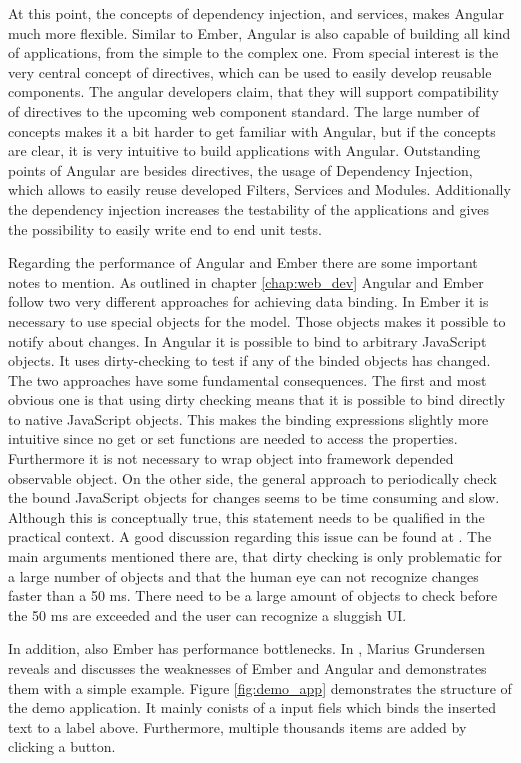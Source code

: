 At this point, the concepts of dependency injection, and services, makes Angular much more flexible.
Similar to Ember, Angular is also capable of building all kind of applications, from the simple to the complex one.
From special interest is the very central concept of directives, which can be used to easily develop reusable components. The angular developers claim, that they will support compatibility of directives to the upcoming web component standard.
The large number of concepts makes it a bit harder to get familiar with Angular, but if the concepts are clear, it is very intuitive to build applications with Angular.
Outstanding points of Angular are besides directives, the usage of Dependency Injection, which allows to easily reuse developed Filters, Services and Modules. Additionally the dependency injection increases the testability of the applications and gives the possibility to easily write end to end unit tests. 

Regarding the performance of Angular and Ember there are some important notes to mention. As outlined in chapter \ref{chap:web_dev} Angular and Ember follow two very different approaches for achieving data binding. In Ember it is necessary to use special objects for the model. Those objects makes it possible to notify about changes. In Angular it is possible to bind to arbitrary JavaScript objects. It uses dirty-checking to test if any of the binded objects has changed.
The two approaches have some fundamental consequences.
The first and most obvious one is that using dirty checking means that it is possible to bind directly to native JavaScript objects.
This makes the binding expressions slightly more intuitive since no get or set functions are needed to access the properties.
Furthermore it is not necessary to wrap object into  framework depended observable object.
On the other side, the general approach to periodically check the bound JavaScript objects for changes seems to be time consuming and slow.
Although this is conceptually true, this statement needs to be qualified in the practical context.
A good discussion regarding this issue can be found at \autocite{tech-ana:ng-binding}.
The main arguments mentioned there are, that dirty checking is only problematic for a large number of objects and that the human eye can not recognize changes faster than a 50 ms.
There need to be a large amount of objects to check before the 50 ms are exceeded and the user can recognize a sluggish UI.

In addition, also Ember has performance bottlenecks. 
In \autocite{binding_comparison}, Marius Grundersen reveals and discusses the weaknesses of Ember and Angular and demonstrates them with a simple example. 
Figure \ref{fig:demo_app} demonstrates the structure of the demo application. It mainly conists of a input fiels which binds the inserted text to a label above. 
Furthermore, multiple thousands items are added by clicking a button. 

